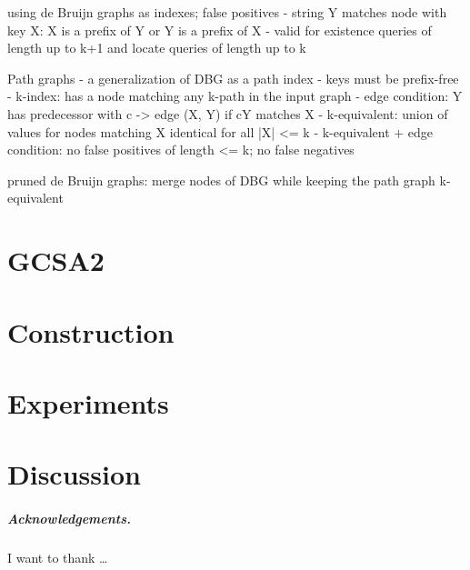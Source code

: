 \documentclass[a4paper,UKenglish]{lipics-v2016}
\begin{document}
using de Bruijn graphs as indexes; false positives
- string Y matches node with key X: X is a prefix of Y or Y is a prefix of X
- valid for existence queries of length up to k+1 and locate queries of length up to k

Path graphs
- a generalization of DBG as a path index
- keys must be prefix-free
- k-index: has a node matching any k-path in the input graph
- edge condition: Y has predecessor with c -> edge (X, Y) if cY matches X
- k-equivalent: union of values for nodes matching X identical for all |X| <= k
- k-equivalent + edge condition: no false positives of length <= k; no false negatives

pruned de Bruijn graphs: merge nodes of DBG while keeping the path graph k-equivalent


\section{GCSA2}


\section{Construction}


\section{Experiments}


\section{Discussion}


\subparagraph*{Acknowledgements.}

I want to thank \dots



\end{document}
